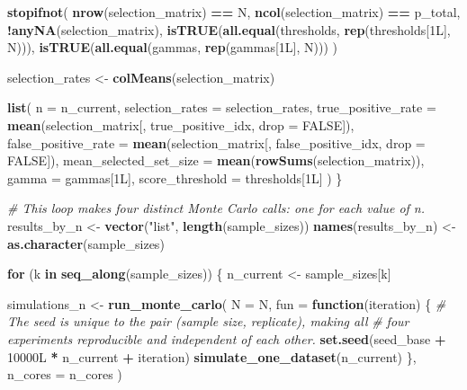 \documentclass[
]{article}
\newenvironment{Shaded}{\begin{snugshade}}{\end{snugshade}}
\newcommand{\AttributeTok}[1]{\textcolor[rgb]{0.13,0.29,0.53}{#1}}
\newcommand{\CommentTok}[1]{\textcolor[rgb]{0.56,0.35,0.01}{\textit{#1}}}
\newcommand{\ConstantTok}[1]{\textcolor[rgb]{0.56,0.35,0.01}{#1}}
\newcommand{\ControlFlowTok}[1]{\textcolor[rgb]{0.13,0.29,0.53}{\textbf{#1}}}
\newcommand{\DataTypeTok}[1]{\textcolor[rgb]{0.13,0.29,0.53}{#1}}
\newcommand{\DecValTok}[1]{\textcolor[rgb]{0.00,0.00,0.81}{#1}}
\newcommand{\FunctionTok}[1]{\textcolor[rgb]{0.13,0.29,0.53}{\textbf{#1}}}
\newcommand{\NormalTok}[1]{#1}
\newcommand{\OtherTok}[1]{\textcolor[rgb]{0.56,0.35,0.01}{#1}}
\newcommand{\SpecialCharTok}[1]{\textcolor[rgb]{0.81,0.36,0.00}{\textbf{#1}}}
\newcommand{\StringTok}[1]{\textcolor[rgb]{0.31,0.60,0.02}{#1}}
\begin{document}
\begin{Shaded}
\begin{Highlighting}[]
  \FunctionTok{stopifnot}\NormalTok{(}
    \FunctionTok{nrow}\NormalTok{(selection\_matrix) }\SpecialCharTok{==}\NormalTok{ N,}
    \FunctionTok{ncol}\NormalTok{(selection\_matrix) }\SpecialCharTok{==}\NormalTok{ p\_total,}
    \SpecialCharTok{!}\FunctionTok{anyNA}\NormalTok{(selection\_matrix),}
    \FunctionTok{isTRUE}\NormalTok{(}\FunctionTok{all.equal}\NormalTok{(thresholds, }\FunctionTok{rep}\NormalTok{(thresholds[}\DecValTok{1}\DataTypeTok{L}\NormalTok{], N))),}
    \FunctionTok{isTRUE}\NormalTok{(}\FunctionTok{all.equal}\NormalTok{(gammas, }\FunctionTok{rep}\NormalTok{(gammas[}\DecValTok{1}\DataTypeTok{L}\NormalTok{], N)))}
\NormalTok{  )}

\NormalTok{  selection\_rates }\OtherTok{\textless{}{-}} \FunctionTok{colMeans}\NormalTok{(selection\_matrix)}

  \FunctionTok{list}\NormalTok{(}
    \AttributeTok{n =}\NormalTok{ n\_current,}
    \AttributeTok{selection\_rates =}\NormalTok{ selection\_rates,}
    \AttributeTok{true\_positive\_rate =} \FunctionTok{mean}\NormalTok{(selection\_matrix[, true\_positive\_idx, }\AttributeTok{drop =} \ConstantTok{FALSE}\NormalTok{]),}
    \AttributeTok{false\_positive\_rate =} \FunctionTok{mean}\NormalTok{(selection\_matrix[, false\_positive\_idx, }\AttributeTok{drop =} \ConstantTok{FALSE}\NormalTok{]),}
    \AttributeTok{mean\_selected\_set\_size =} \FunctionTok{mean}\NormalTok{(}\FunctionTok{rowSums}\NormalTok{(selection\_matrix)),}
    \AttributeTok{gamma =}\NormalTok{ gammas[}\DecValTok{1}\DataTypeTok{L}\NormalTok{],}
    \AttributeTok{score\_threshold =}\NormalTok{ thresholds[}\DecValTok{1}\DataTypeTok{L}\NormalTok{]}
\NormalTok{  )}
\NormalTok{\}}

\CommentTok{\# This loop makes four distinct Monte Carlo calls: one for each value of n.}
\NormalTok{results\_by\_n }\OtherTok{\textless{}{-}} \FunctionTok{vector}\NormalTok{(}\StringTok{"list"}\NormalTok{, }\FunctionTok{length}\NormalTok{(sample\_sizes))}
\FunctionTok{names}\NormalTok{(results\_by\_n) }\OtherTok{\textless{}{-}} \FunctionTok{as.character}\NormalTok{(sample\_sizes)}

\ControlFlowTok{for}\NormalTok{ (k }\ControlFlowTok{in} \FunctionTok{seq\_along}\NormalTok{(sample\_sizes)) \{}
\NormalTok{  n\_current }\OtherTok{\textless{}{-}}\NormalTok{ sample\_sizes[k]}

\NormalTok{  simulations\_n }\OtherTok{\textless{}{-}} \FunctionTok{run\_monte\_carlo}\NormalTok{(}
    \AttributeTok{N =}\NormalTok{ N,}
    \AttributeTok{fun =} \ControlFlowTok{function}\NormalTok{(iteration) \{}
      \CommentTok{\# The seed is unique to the pair (sample size, replicate), making all}
      \CommentTok{\# four experiments reproducible and independent of each other.}
      \FunctionTok{set.seed}\NormalTok{(seed\_base }\SpecialCharTok{+} \DecValTok{10000}\DataTypeTok{L} \SpecialCharTok{*}\NormalTok{ n\_current }\SpecialCharTok{+}\NormalTok{ iteration)}
      \FunctionTok{simulate\_one\_dataset}\NormalTok{(n\_current)}
\NormalTok{    \},}
    \AttributeTok{n\_cores =}\NormalTok{ n\_cores}
\NormalTok{  )}


\end{Highlighting}
\end{Shaded}
\end{document}
